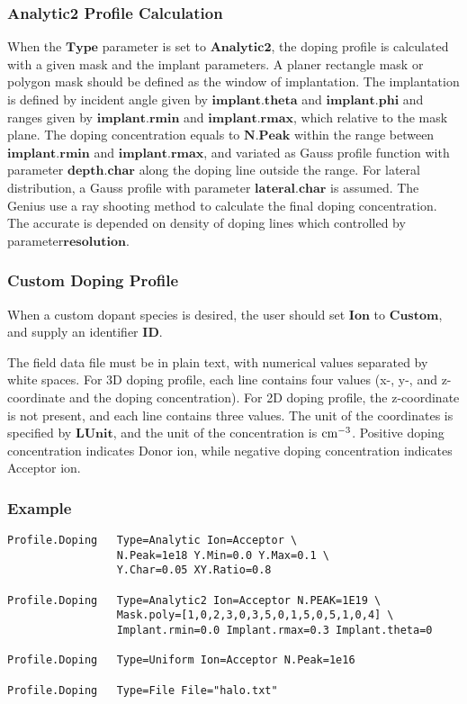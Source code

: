 \documentclass[oneside,12pt]{cgd_book}
\begin{document}
\subsubsection{Analytic2 Profile Calculation}
When the $\mathbf{Type}$ parameter is set to $\mathbf{Analytic2}$, the doping
          profile is calculated with a given mask and the implant parameters. A planer rectangle mask or polygon mask
          should be defined as the window of implantation. The implantation is defined by incident angle given by
$\mathbf{implant.theta}$ and $\mathbf{implant.phi}$ and ranges given by
$\mathbf{implant.rmin}$ and $\mathbf{implant.rmax}$, which relative to the mask plane.
          The doping concentration equals to $\mathbf{N.Peak}$ within the range between
$\mathbf{implant.rmin}$ and $\mathbf{implant.rmax}$, and variated as Gauss profile
          function with parameter $\mathbf{depth.char}$ along the doping line outside the range. For lateral
          distribution, a Gauss profile with parameter $\mathbf{lateral.char}$
is assumed. The Genius use a
          ray shooting method to calculate the final doping concentration. The accurate is depended on density of doping
          lines which controlled by parameter$\mathbf{ resolution}$.
\par
\subsubsection{Custom Doping Profile}
When a custom dopant species is desired, the user should set $\mathbf{Ion}$
to $\mathbf{Custom}$, and supply an identifier $\mathbf{ID}$.
\par
{}The field data file must be in plain text, with numerical values separated by white spaces. For 3D
            doping profile, each line contains four values (x-, y-, and z-coordinate and the doping concentration). For
            2D doping profile, the z-coordinate is not present, and each line contains three values. The unit of the
            coordinates is specified by $\mathbf{LUnit}$, and the unit of the concentration is
$\text{cm}^{-3}$. Positive doping concentration indicates Donor ion, while negative doping
            concentration indicates Acceptor ion.
\par
\par
\subsubsection{Example}
\begin{lstlisting}[style=GeniusCode]
Profile.Doping   Type=Analytic Ion=Acceptor \
                 N.Peak=1e18 Y.Min=0.0 Y.Max=0.1 \
                 Y.Char=0.05 XY.Ratio=0.8

Profile.Doping   Type=Analytic2 Ion=Acceptor N.PEAK=1E19 \
                 Mask.poly=[1,0,2,3,0,3,5,0,1,5,0,5,1,0,4] \
                 Implant.rmin=0.0 Implant.rmax=0.3 Implant.theta=0

Profile.Doping   Type=Uniform Ion=Acceptor N.Peak=1e16

Profile.Doping   Type=File File="halo.txt"
\end{lstlisting}
\end{document}
